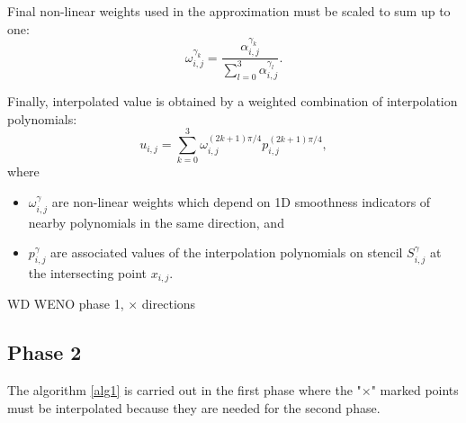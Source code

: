 	Final non-linear weights used in the approximation must be scaled to sum up to one:
	\begin{equation}\label{eq IzrazOmega2d}
		\omega_{i,j}^{\gamma_k}=\frac{\alpha_{i,j}^{\gamma_k}}{\sum_{l=0}^3\alpha_{i,j}^{\gamma_l}}.
	\end{equation}
	
	Finally, interpolated value is obtained by a weighted combination of interpolation polynomials:
	 \begin{equation}\label{eq 2dKombinacija}
	 	u_{i,j}=\sum_{k=0}^3 \omega_{i,j}^{(2k+1)\pi/4} p_{i,j}^{(2k+1)\pi/4},
	 \end{equation}
	 where \begin{itemize}
	 	\item $\omega_{i,j}^\gamma$ are non-linear weights which depend on 1D smoothness indicators of nearby polynomials in the same direction, and
	 	\item $p_{i,j}^\gamma$ are associated values of the interpolation polynomials on stencil $S_{i,j}^{\gamma}$ at the intersecting point $x_{i,j}$.
	 \end{itemize}

\begin{algorithm}
	\SetAlgoLined
	\footnotesize
	\caption{ {WD} WENO phase 1, $\times$ directions }
	\label{alg1}
\end{algorithm}	

 
	\subsection{Phase 2}
	 	

The algorithm \ref{alg1} is carried out in the first phase where the "$\times$" marked points must be interpolated because they are needed for the second phase. 
	
